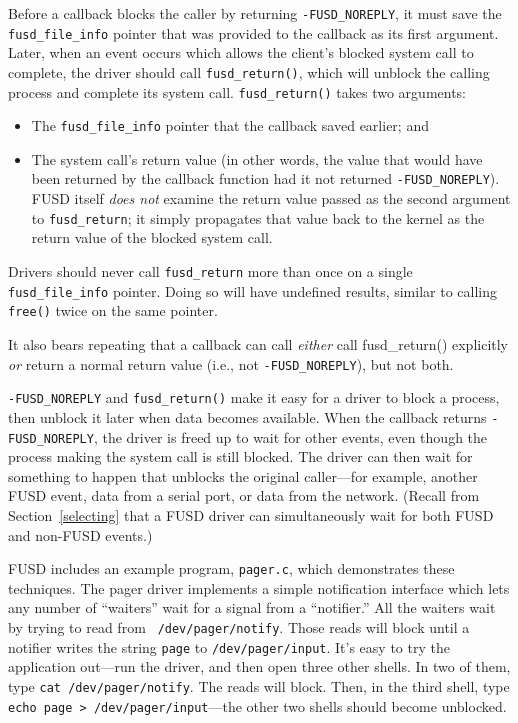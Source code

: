 \documentclass{article}
\begin{document}
Before a callback blocks the caller by returning {\tt -FUSD\_NOREPLY},
it must save the {\tt fusd\_file\_info} pointer that was provided to
the callback as its first argument.  Later, when an event occurs which
allows the client's blocked system call to complete, the driver should
call {\tt fusd\_return()}, which will unblock the calling process and
complete its system call.  {\tt fusd\_return()} takes two arguments:
\begin{itemize}
\item The {\tt fusd\_file\_info} pointer that the callback saved
earlier; and
\item The system call's return value (in other words, the value that
would have been returned by the callback function had it not returned
{\tt -FUSD\_NOREPLY}).  FUSD itself {\em does not} examine the return
value passed as the second argument to {\tt fusd\_return}; it simply
propagates that value back to the kernel as the return value of the
blocked system call.
\end{itemize}

Drivers should never call {\tt fusd\_return} more than once on a
single {\tt fusd\_file\_info} pointer.  Doing so will have undefined
results, similar to calling {\tt free()} twice on the same pointer.

It also bears repeating that a callback can call {\em either} call
fusd\_return() explicitly {\em or} return a normal return value (i.e.,
not {\tt -FUSD\_NOREPLY}), but not both.

{\tt -FUSD\_NOREPLY} and {\tt fusd\_return()} make it easy for a
driver to block a process, then unblock it later when data becomes
available.  When the callback returns {\tt -FUSD\_NOREPLY}, the driver
is freed up to wait for other events, even though the process making
the system call is still blocked.  The driver can then wait for
something to happen that unblocks the original caller---for example,
another FUSD event, data from a serial port, or data from the network.
(Recall from Section~\ref{selecting} that a FUSD driver can
simultaneously wait for both FUSD and non-FUSD events.)

FUSD includes an example program, {\tt pager.c}, which demonstrates
these techniques.  The pager driver implements a simple notification
interface which lets any number of ``waiters'' wait for a signal from
a ``notifier.''  All the waiters wait by trying to read from {\tt
/dev/pager/notify}.  Those reads will block until a notifier writes
the string {\tt page} to {\tt /dev/pager/input}.  It's easy to try
the application out---run the driver, and then open three other
shells.  In two of them, type {\tt cat /dev/pager/notify}.  The reads
will block.  Then, in the third shell, type {\tt echo page >
/dev/pager/input}---the other two shells should become unblocked.
\end{document}
